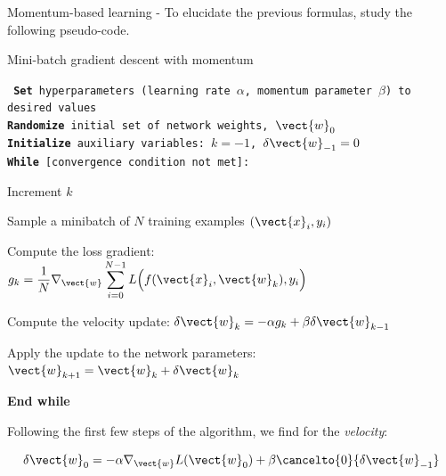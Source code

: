 \begin{frame}[t,allowframebreaks]{
    Momentum-based learning -}
    To elucidate the previous formulas, study the following pseudo-code.\\
    \vspace{0.1cm}
    \begin{block}{
        Mini-batch \gls{gradient descent}
        with \gls{momentum}}
    {\tt \scriptsize
       {\bf Set} hyperparameters 
       (learning rate $\alpha$, momentum parameter $\beta$) to desired values\\
       \vspace{0.1cm}
       {\bf Randomize} initial set of network weights, $\vect{w}_{0}$\\
       \vspace{0.1cm}
       {\bf Initialize} auxiliary variables: $k=-1$, $\delta \vect{w}_{-1} = 0$\\
       \vspace{0.1cm}
       {\bf While} [convergence condition not met]:\\
       \vspace{0.1cm}
       \begin{itemize}        
        {\scriptsize
        \item Increment $k$
        \vspace{0.2cm}
        \item Sample a minibatch of $N$ training examples 
        $(\vect{x}_i, y_i)$
        \item Compute the loss gradient:
        $\displaystyle g_k = \frac{1}{N} \nabla_{\vect{w}} 
          \sum_{i=0}^{N-1} L\Big(f(\vect{x}_i, \vect{w}_{k}),y_i\Big)$ 
        \item Compute the velocity update: $\delta \vect{w}_{k} =  
                - \alpha g_k
                + \beta \delta \vect{w}_{k-1}$\\
        \vspace{0.2cm}
        \item Apply the update to the network parameters: 
              $\vect{w}_{k+1} = \vect{w}_{k} + \delta \vect{w}_{k}$
        }
       \end{itemize}
       {\bf End while}
    }
    \end{block}

    \framebreak


    Following the first few steps of the algorithm, 
    we find for the {\em velocity}:

    \begin{equation*}
        \delta \vect{w}_{0} = 
        - \alpha \nabla_{\vect{w}} L(\vect{w}_{0})
        + \beta \cancelto{0}{\delta \vect{w}_{-1}}
    \end{equation*}


\end{frame}
